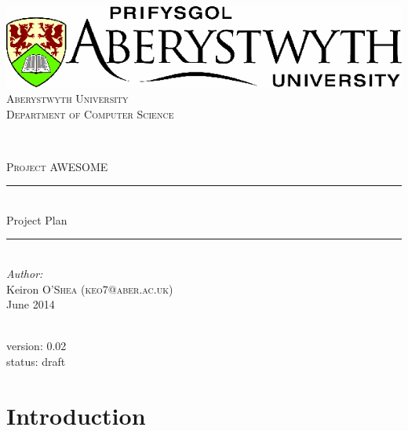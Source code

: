 \documentclass[11pt,a4paper]{article}
\begin{document}

\begin{titlepage}

\newcommand{\HRule}{\rule{\linewidth}{0.5mm}} %

\center %

\includegraphics[scale=0.4]{images/aber.png} \\[1.5cm] %
\textsc{\Large Aberystwyth University
 \\[0.5cm] Department of Computer Science}

\

\textsc{\Large Project AWESOME}\\

\HRule \\[0.4cm]
{ \huge  Project Plan}\\[0.4cm] %
\HRule \\[1.5cm]

\Large \emph{Author:}\\
Keiron \textsc{O'Shea (keo7@aber.ac.uk)}\\[1cm] %

{\large June 2014}\\[2cm] %

\


\small version: 0.02 \\
\small status: draft


\vfill %

\end{titlepage}

\thispagestyle{plain}	

\tableofcontents

\clearpage


\clearpage

\section{Introduction}
\end{document}
